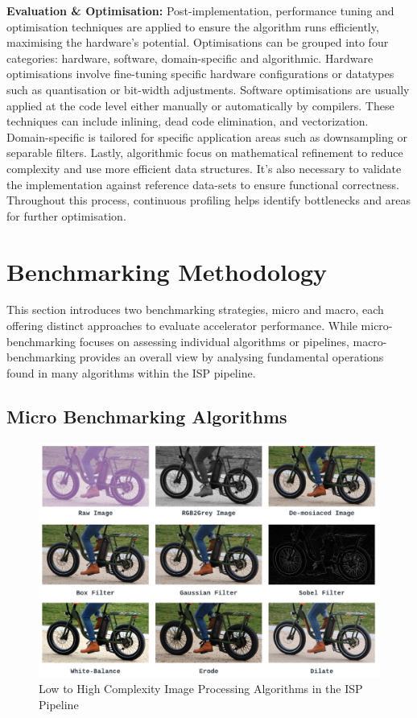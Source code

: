 \textbf{Evaluation \& Optimisation:}
Post-implementation, performance tuning and optimisation techniques are applied to ensure the algorithm runs efficiently, maximising the hardware's potential. Optimisations can be grouped into four categories: hardware, software, domain-specific and algorithmic. Hardware optimisations involve fine-tuning specific hardware configurations or datatypes such as quantisation or bit-width adjustments. Software optimisations are usually applied at the code level either manually or automatically by compilers. These techniques can include inlining, dead code elimination, and vectorization. Domain-specific is tailored for specific application areas such as downsampling or separable filters. Lastly, algorithmic focus on mathematical refinement to reduce complexity and use more efficient data structures. It's also necessary to validate the implementation against reference data-sets to ensure functional correctness. Throughout this process, continuous profiling helps identify bottlenecks and areas for further optimisation. 




\section{Benchmarking Methodology}\label{sec:benchmark}
This section introduces two benchmarking strategies, micro and macro, each offering distinct approaches to evaluate accelerator performance. While micro-benchmarking focuses on assessing individual algorithms or pipelines, macro-benchmarking provides an overall view by analysing fundamental operations found in many algorithms within the ISP pipeline.

\subsection{Micro Benchmarking Algorithms}\label{Benchmarking Algorithms}
\begin{figure}[t]
\centering
  \includegraphics[width=\textwidth]{Images/Processed Images.png}
    \caption[Exemplar Image Pipelines]{Low to High Complexity Image Processing Algorithms in the ISP Pipeline}
    \label{fig:edge-detect} 
\end{figure}

